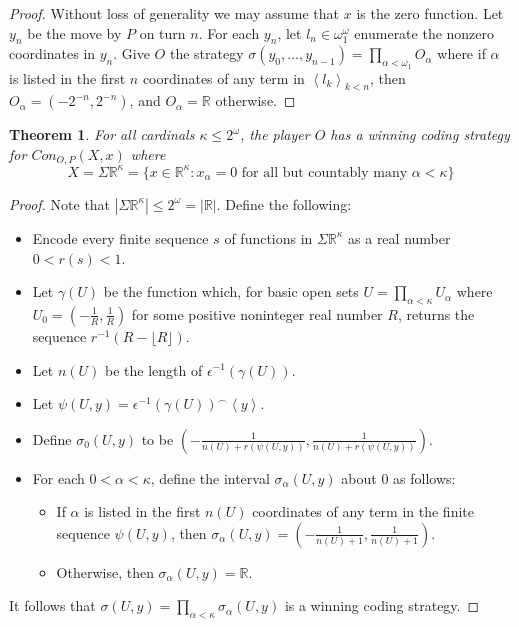 \documentclass[11pt]{article}
\theoremstyle{plain}
\newtheorem{theorem}{Theorem}
\theoremstyle{definition}
\theoremstyle{remark}
\begin{document}
\begin{proof}
Without loss of generality we may assume that $x$ is the zero function. Let $y_n$ be the move by $P$ on turn $n$. For each $y_n$, let $l_n\in \omega_1^{\omega}$ enumerate the nonzero coordinates in $y_n$. Give $O$ the strategy $\sigma(y_0,\dots,y_{n-1}) = \prod_{\alpha<\omega_1} O_\alpha$ where if $\alpha$ is listed in the first $n$ coordinates of any term in $\left<l_k\right>_{k<n}$, then $O_\alpha=(-2^{-n},2^{-n})$, and $O_\alpha=\mathbb{R}$ otherwise.
\end{proof}

\begin{theorem}
For all cardinals $\kappa\leq 2^\omega$, the player $O$ has a winning coding strategy for $Con_{O,P}(X,x)$ where \[X=\Sigma\mathbb{R}^{\kappa}=\{x\in \mathbb{R}^{\kappa}: x_\alpha = 0 \text{ for all but countably many } \alpha<\kappa\}\]
\end{theorem}

\begin{proof}
Note that $|\Sigma\mathbb{R}^\kappa| \leq 2^\omega = |\mathbb{R}|$. Define the following:

    \begin{itemize}
    \item Encode every finite sequence $s$ of functions in $\Sigma\mathbb{R}^{\kappa}$ as a real number $0<r(s)<1$. 
    \item Let $\gamma(U)$ be the function which, for basic open sets $U=\prod_{\alpha<\kappa}U_\alpha$ where $U_0=(-\frac{1}{R},\frac{1}{R})$ for some positive noninteger real number $R$, returns the sequence $r^{-1}(R-\lfloor R\rfloor)$.
    \item Let $n(U)$ be the length of $\epsilon^{-1}(\gamma(U))$.
    \item Let $\psi(U,y)=\epsilon^{-1}(\gamma(U))^\frown\left<y\right>$.
    \item Define $\sigma_0(U,y)$ to be $\left(-\frac{1}{n(U)+r(\psi(U,y))},\frac{1}{n(U)+r(\psi(U,y))}\right)$.
    \item For each $0<\alpha<\kappa$, define the interval $\sigma_\alpha(U,y)$ about $0$ as follows:
        \begin{itemize}
        \item If $\alpha$ is listed in the first $n(U)$ coordinates of any term in the finite sequence $\psi(U,y)$, then $\sigma_\alpha(U,y)=(-\frac{1}{n(U)+1},\frac{1}{n(U)+1})$.
        \item Otherwise, then $\sigma_\alpha(U,y)=\mathbb{R}$.
        \end{itemize}
    \end{itemize}

It follows that $\sigma(U,y)=\prod_{\alpha<\kappa} \sigma_\alpha(U,y)$ is a winning coding strategy.
\end{proof}
\end{document}
